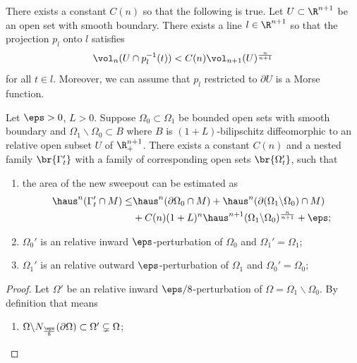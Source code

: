 \begin{theorem}[Falconer]\label{thm:falconer}
    There exists a constant $C(n)$ so that the following is true. Let $U \subset \R^{n + 1}$ be an open set with smooth boundary. There exists a line $l \in \R^{n + 1}$ so that the projection $p_l$ onto $l$ satisfies 
    \begin{equation*}
        \vol_n(U\cap p^{-1}_l(t)) < C(n)\vol_{n + 1}(U)^{\frac{n}{n + 1}}
    \end{equation*}
    for all $t \in l$. Moreover, we can assume that $p_l$ restricted to $\partial U$ is a Morse function. 
\end{theorem}
\begin{lemma}\label{lem:existence-nested-between-sets}
    Let $\eps > 0$, $L > 0$. Suppose $\Omega_0 \subset \Omega_1$ be bounded open sets with smooth boundary and $\Omega_1 \backslash \Omega_0 \subset B$ where $B$ is $(1 + L)$-bilipschitz diffeomorphic to an relative open subset $U$ of $\R^{n + 1}_+$. There exists a constant $C(n)$ and a nested family $\br{\Gamma_t'}$ with a family of corresponding open sets $\br{\Omega_t'}$, such that
    \begin{enumerate}
        \item[(1)] the area of the new sweepout can be estimated as 
        \begin{equation*}
            \begin{split}
                \haus^n(\Gamma_t'\cap M) \leq& \haus^n(\partial\Omega_0\cap M) + \haus^n(\partial(\Omega_1\backslash\Omega_0)\cap M)\\
                &+ C(n)(1 + L)^n\haus^{n + 1}(\Omega_1\backslash\Omega_0)^{\frac{n}{n + 1}} + \eps;
            \end{split}
        \end{equation*}
        \item[(2)] $\Omega_0'$ is an relative inward $\eps$-perturbation of $\Omega_0$ and $\Omega_1' = \Omega_1$;
        \item[(2')] $\Omega_1'$ is an relative outward $\eps$-perturbation of $\Omega_1$ and $\Omega_0' = \Omega_0$;
    \end{enumerate}
    \begin{proof}
        Let $\Omega'$ be an relative inward  $\eps/8$-perturbation of $\Omega = \Omega_1\backslash\Omega_0$. By definition that means
        \begin{enumerate}
            \item[(a)] $\Omega\backslash N_\frac{\eps}{8}(\partial\Omega) \subset \Omega' \subsetneq \Omega$;

\end{enumerate}
\end{proof}
\end{lemma}
